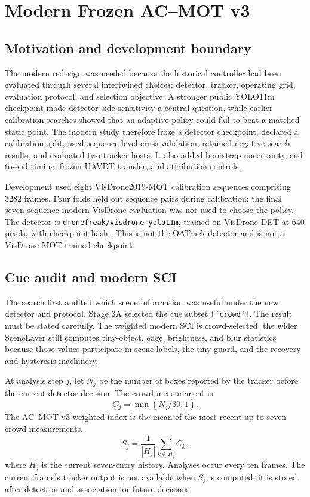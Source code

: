 \section{Modern Frozen AC--MOT v3}
\subsection{Motivation and development boundary}
The modern redesign was needed because the historical controller had been evaluated through several intertwined choices: detector, tracker, operating grid, evaluation protocol, and selection objective. A stronger public YOLO11m checkpoint made detector-side sensitivity a central question, while earlier calibration searches showed that an adaptive policy could fail to beat a matched static point. The modern study therefore froze a detector checkpoint, declared a calibration split, used sequence-level cross-validation, retained negative search results, and evaluated two tracker hosts. It also added bootstrap uncertainty, end-to-end timing, frozen UAVDT transfer, and attribution controls.

Development used eight VisDrone2019-MOT calibration sequences comprising 3282 frames. Four folds held out sequence pairs during calibration; the final seven-sequence modern VisDrone evaluation was not used to choose the policy. The detector is \texttt{dronefreak/visdrone-yolo11m}, trained on VisDrone-DET at 640 pixels, with checkpoint hash \checkpointsha. This is not the OATrack detector and is not a VisDrone-MOT-trained checkpoint.

\subsection{Cue audit and modern SCI}
The search first audited which scene information was useful under the new detector and protocol. Stage 3A selected the cue subset \texttt{['crowd']}. The result must be stated carefully. The weighted modern SCI is crowd-selected; the wider SceneLayer still computes tiny-object, edge, brightness, and blur statistics because those values participate in scene labels, the tiny guard, and the recovery and hysteresis machinery.

At analysis step $j$, let $N_j$ be the number of boxes reported by the tracker before the current detector decision. The crowd measurement is
\begin{equation}
C_j=\min(N_j/30,1).
\end{equation}
The AC--MOT v3 weighted index is the mean of the most recent up-to-seven crowd measurements,
\begin{equation}
S_j=\frac{1}{|H_j|}\sum_{k\in H_j}C_k,
\end{equation}
where $H_j$ is the current seven-entry history. Analyses occur every ten frames. The current frame's tracker output is not available when $S_j$ is computed; it is stored after detection and association for future decisions.

